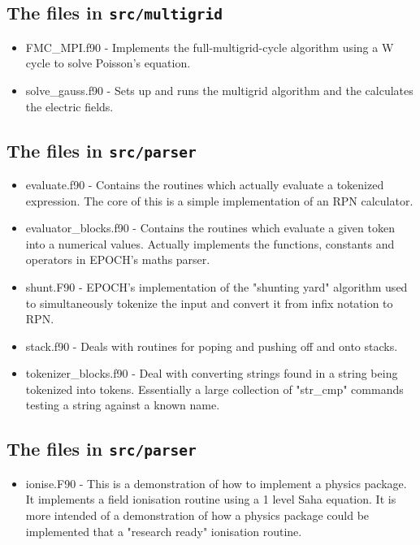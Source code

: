 \documentclass[12pt,a4paper]{article}
\newcommand{\inlinecode}[1]{{\color{warwickred} \bf\texttt{#1}}}
\begin{document}
\subsection{The files in \inlinecode{src/multigrid}}
\begin{itemize}
\item FMC\_MPI.f90 - Implements the full-multigrid-cycle algorithm using a W
  cycle to solve Poisson's equation.
\item solve\_gauss.f90 - Sets up and runs the multigrid algorithm and the
  calculates the electric fields.
\end{itemize}

\subsection{The files in \inlinecode{src/parser}}
\begin{itemize}
\item evaluate.f90 - Contains the routines which actually evaluate a tokenized
  expression. The core of this is a simple implementation of an RPN
  calculator.
\item evaluator\_blocks.f90 - Contains the routines which evaluate a given
  token into a numerical values. Actually implements the functions, constants
  and operators in EPOCH's maths parser.
\item shunt.F90 - EPOCH's implementation of the "shunting yard" algorithm used
  to simultaneously tokenize the input and convert it from infix notation to
  RPN.
\item stack.f90 - Deals with routines for poping and pushing off and onto
  stacks.
\item tokenizer\_blocks.f90 - Deal with converting strings found in a string
  being tokenized into tokens. Essentially a large collection of "str\_cmp"
  commands testing a string against a known name.
\end{itemize}

\subsection{The files in \inlinecode{src/parser}}
\begin{itemize}
\item ionise.F90 - This is a demonstration of how to implement a physics
  package. It implements a field ionisation routine using a 1 level Saha
  equation. It is more intended of a demonstration of how a physics package
  could be implemented that a "research ready" ionisation routine.
\end{itemize}
\end{document}
